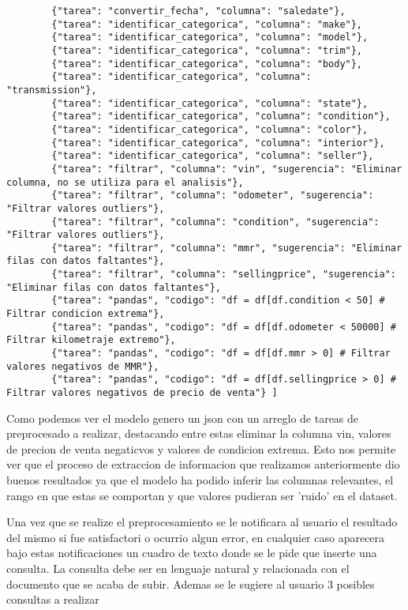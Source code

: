 \begin{lstlisting}
		{"tarea": "convertir_fecha", "columna": "saledate"}, 
		{"tarea": "identificar_categorica", "columna": "make"}, 
		{"tarea": "identificar_categorica", "columna": "model"}, 
		{"tarea": "identificar_categorica", "columna": "trim"}, 
		{"tarea": "identificar_categorica", "columna": "body"}, 
		{"tarea": "identificar_categorica", "columna": "transmission"}, 
		{"tarea": "identificar_categorica", "columna": "state"}, 
		{"tarea": "identificar_categorica", "columna": "condition"}, 
		{"tarea": "identificar_categorica", "columna": "color"}, 
		{"tarea": "identificar_categorica", "columna": "interior"}, 
		{"tarea": "identificar_categorica", "columna": "seller"}, 
		{"tarea": "filtrar", "columna": "vin", "sugerencia": "Eliminar columna, no se utiliza para el analisis"}, 
		{"tarea": "filtrar", "columna": "odometer", "sugerencia": "Filtrar valores outliers"}, 
		{"tarea": "filtrar", "columna": "condition", "sugerencia": "Filtrar valores outliers"}, 
		{"tarea": "filtrar", "columna": "mmr", "sugerencia": "Eliminar filas con datos faltantes"}, 
		{"tarea": "filtrar", "columna": "sellingprice", "sugerencia": "Eliminar filas con datos faltantes"}, 
		{"tarea": "pandas", "codigo": "df = df[df.condition < 50] # Filtrar condicion extrema"}, 
		{"tarea": "pandas", "codigo": "df = df[df.odometer < 50000] # Filtrar kilometraje extremo"}, 
		{"tarea": "pandas", "codigo": "df = df[df.mmr > 0] # Filtrar valores negativos de MMR"}, 
		{"tarea": "pandas", "codigo": "df = df[df.sellingprice > 0] # Filtrar valores negativos de precio de venta"} ]
\end{lstlisting}

Como podemos ver el modelo genero un json con un arreglo de tareas de preprocesado a realizar, destacando entre estas eliminar la columna vin, valores de precion de venta negaticvos y valores de condicion extrema. Esto nos permite ver que el proceso de extraccion de informacion que realizamos anteriormente dio buenos resultados ya que el modelo ha podido inferir las columnas relevantes, el rango en que estas se comportan y que valores pudieran ser 'ruido' en el dataset.

Una vez que se realize el preprocesamiento se le notificara al usuario el resultado del mismo si fue satisfactori o ocurrio algun error, en cualquier caso aparecera bajo estas notificaciones un cuadro de texto donde se le pide que inserte una consulta. La consulta debe ser en lenguaje natural y relacionada con el documento que se acaba de subir. Ademas se le sugiere al usuario 3 posibles consultas a realizar